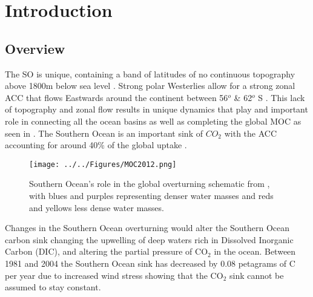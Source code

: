 \chapter[Introduction]{Introduction}

\section*{Overview}

The \gls{SO} is unique, containing a band of latitudes of no continuous
topography above 1800m below sea level \citep{hallberg2006}. Strong
polar Westerlies allow for a strong zonal \gls{ACC} that flows Eastwards around the continent between 56$^o$ \& 62$^o$ S \citep{johnson1989}. This lack of topography and zonal flow results in unique dynamics that play and important role in connecting all the ocean basins as well as completing the global \gls{MOC} \citep{marshall2012} as seen in . The Southern Ocean is an important sink of $CO_2$ with the \gls{ACC} accounting for around 40$\%$ of the global uptake \citep{Mignone2006}. 

\begin{figure}[h]
\centering
\texttt{[image: ../../Figures/MOC2012.png]}
\caption{Southern Ocean's role in the global overturning schematic from \cite{marshall2012}, with blues and purples representing denser water masses and reds and yellows less dense water masses.}
\label{fig:MS2012}
\end{figure}

Changes in the Southern Ocean overturning would alter the Southern Ocean carbon sink changing the upwelling of deep waters rich in Dissolved Inorganic Carbon (DIC), and altering the partial pressure of CO$_2$ in the ocean. Between 1981 and 2004 the Southern Ocean sink has decreased by 0.08 petagrams of C per year due to increased wind stress showing that the CO$_2$ sink cannot be assumed to stay constant\citep{lequere2007}. 

